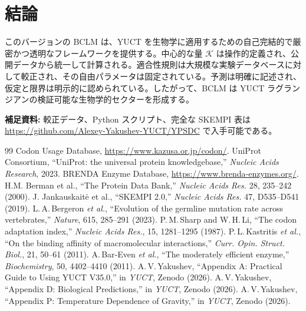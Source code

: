 \documentclass[12pt,a4paper]{ltjsarticle}
\newcommand{\REL}{\mathcal{K}}          %
\begin{document}
	\section{結論}
	このバージョンの BCLM は、YUCT を生物学に適用するための自己完結的で厳密かつ透明なフレームワークを提供する。中心的な量 \(\REL\) は操作的定義され、公開データから統一して計算される。適合性規則は大規模な実験データベースに対して較正され、その自由パラメータは固定されている。予測は明確に記述され、仮定と限界は明示的に認められている。したがって、BCLM は YUCT ラグランジアンの検証可能な生物学的セクターを形成する。
	
	\vspace{0.5cm}
	\noindent\textbf{補足資料:} 較正データ、Python スクリプト、完全な SKEMPI 表は \url{https://github.com/Alexey-Yakushev-YUCT/YPSDC} で入手可能である。
	
	\begin{thebibliography}{99}
		 Codon Usage Database, \url{https://www.kazusa.or.jp/codon/}.
		 UniProt Consortium, ``UniProt: the universal protein knowledgebase,'' \emph{Nucleic Acids Research}, 2023.
		 BRENDA Enzyme Database, \url{https://www.brenda-enzymes.org/}.
		 H.M. Berman et al., ``The Protein Data Bank,'' \emph{Nucleic Acids Res.} 28, 235–242 (2000).
		 J. Jankauskaitė et al., ``SKEMPI 2.0,'' \emph{Nucleic Acids Res.} 47, D535–D541 (2019).
		 L.\,A.\,Bergeron \emph{et al.}, ``Evolution of the germline mutation rate across vertebrates,'' \emph{Nature}, 615, 285–291 (2023).
		 P.\,M.\,Sharp and W.\,H.\,Li, ``The codon adaptation index,'' \emph{Nucleic Acids Res.}, 15, 1281–1295 (1987).
		 P.\,L.\,Kastritis \emph{et al.}, ``On the binding affinity of macromolecular interactions,'' \emph{Curr. Opin. Struct. Biol.}, 21, 50–61 (2011).
		 A.\,Bar‑Even \emph{et al.}, ``The moderately efficient enzyme,'' \emph{Biochemistry}, 50, 4402–4410 (2011).
		 A.\,V.\,Yakushev, ``Appendix A: Practical Guide to Using YUCT V35.0,'' in \emph{YUCT}, Zenodo (2026).
		 A.\,V.\,Yakushev, ``Appendix D: Biological Predictions,'' in \emph{YUCT}, Zenodo (2026).
		 A.\,V.\,Yakushev, ``Appendix P: Temperature Dependence of Gravity,'' in \emph{YUCT}, Zenodo (2026).
	\end{thebibliography}
	
\end{document}
